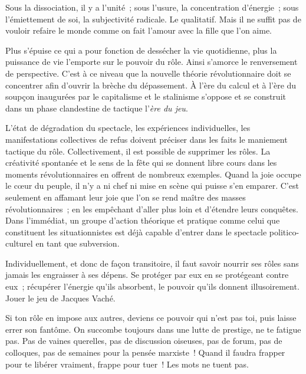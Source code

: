 \documentclass[french,twoside]{book} %
\begin{document}
\noindent Sous la dissociation, il y a l’unité ; sous l’usure, la concentration d’énergie ; sous l’émiettement de soi, la subjectivité radicale. Le qualitatif. Mais il ne suffit pas de vouloir refaire le monde comme on fait l’amour avec la fille que l’on aime.\par
Plus s’épuise ce qui a pour fonction de dessécher la vie quotidienne, plus la puissance de vie l’emporte sur le pouvoir du rôle. Ainsi s’amorce le renversement de perspective. C’est à ce niveau que la nouvelle théorie révolutionnaire doit se concentrer afin d’ouvrir la brèche du dépassement. À l’ère du calcul et à l’ère du soupçon inaugurées par le capitalisme et le stalinisme s’oppose et se construit dans un phase clandestine de tactique l’\emph{ère du jeu}.\par
L’état de dégradation du spectacle, les expériences individuelles, les manifestations collectives de refus doivent préciser dans les faits le maniement tactique du rôle. Collectivement, il est possible de supprimer les rôles. La créativité spontanée et le sens de la fête qui se donnent libre cours dans les moments révolutionnaires en offrent de nombreux exemples. Quand la joie occupe le cœur du peuple, il n’y a ni chef ni mise en scène qui puisse s’en emparer. C’est seulement en affamant leur joie que l’on se rend maître des masses révolutionnaires ; en les empêchant d’aller plus loin et d’étendre leurs conquêtes. Dans l’immédiat, un groupe d’action théorique et pratique comme celui que constituent les situationnistes est déjà capable d’entrer dans le spectacle politico-culturel en tant que subversion.\par
Individuellement, et donc de façon transitoire, il faut savoir nourrir ses rôles sans jamais les engraisser à ses dépens. Se protéger par eux en se protégeant contre eux ; récupérer l’énergie qu’ils absorbent, le pouvoir qu’ils donnent illusoirement. Jouer le jeu de Jacques Vaché.\par
Si ton rôle en impose aux autres, deviens ce pouvoir qui n’est pas toi, puis laisse errer son fantôme. On succombe toujours dans une lutte de prestige, ne te fatigue pas. Pas de vaines querelles, pas de discussion oiseuses, pas de forum, pas de colloques, pas de semaines pour la pensée marxiste ! Quand il faudra frapper pour te libérer vraiment, frappe pour tuer ! Les mots ne tuent pas.\par
\end{document}
